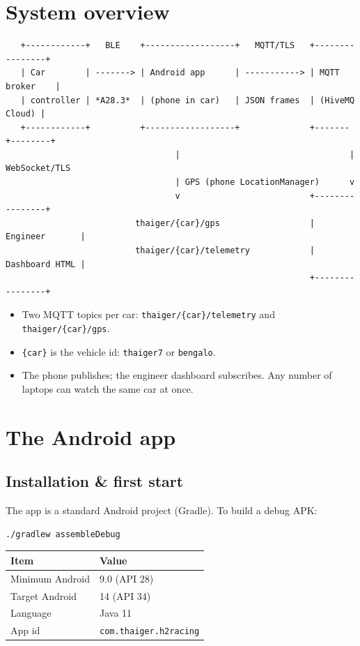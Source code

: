 \documentclass[11pt,a4paper,oneside]{report}
\newcommand{\code}[1]{\texttt{#1}}
\begin{document}
\section{System overview}

\begin{lstlisting}
   +------------+   BLE    +------------------+   MQTT/TLS   +----------------+
   | Car        | -------> | Android app      | -----------> | MQTT broker    |
   | controller | *A28.3*  | (phone in car)   | JSON frames  | (HiveMQ Cloud) |
   +------------+          +------------------+              +-------+--------+
                                  |                                  | WebSocket/TLS
                                  | GPS (phone LocationManager)      v
                                  v                          +----------------+
                          thaiger/{car}/gps                  | Engineer       |
                          thaiger/{car}/telemetry            | Dashboard HTML |
                                                             +----------------+
\end{lstlisting}
\begin{itemize}
  \item Two MQTT topics per car: \code{thaiger/\{car\}/telemetry} and
    \code{thaiger/\{car\}/gps}.
  \item \code{\{car\}} is the vehicle id: \code{thaiger7} or \code{bengalo}.
  \item The phone publishes; the engineer dashboard subscribes. Any number of
    laptops can watch the same car at once.
\end{itemize}

\section{The Android app}

\subsection{Installation \& first start}
The app is a standard Android project (Gradle). To build a debug APK:

\begin{lstlisting}
./gradlew assembleDebug
\end{lstlisting}

\begin{tabularx}{\linewidth}{@{}lL@{}}
\toprule
\textbf{Item} & \textbf{Value}\\
\midrule
Minimum Android & 9.0 (API 28)\\
Target Android  & 14 (API 34)\\
Language        & Java 11\\
App id          & \code{com.thaiger.h2racing}\\
\bottomrule
\end{tabularx}
\end{document}
